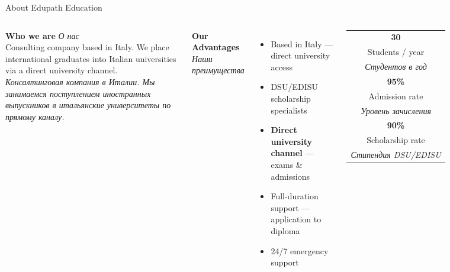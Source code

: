 \documentclass[aspectratio=169]{beamer}
\newcommand{\ru}[1]{{\textit{#1}}}
\newcommand{\biframe}[2]{\begin{frame}{#1}\noindent{\scriptsize\textit{#2}}\vspace{0.2em}}
\begin{document}
\biframe{About Edupath Education}{О компании}
\footnotesize
\begin{columns}[T]
\textbf{Who we are} \ru{О нас}\\
Consulting company based in Italy. We place international graduates into Italian universities via a direct university channel.\\
\ru{Консалтинговая компания в Италии. Мы занимаемся поступлением иностранных выпускников в итальянские университеты по прямому каналу.}

\textbf{Our Advantages} \ru{Наши преимущества}
\begin{itemize}\setlength{\itemsep}{0pt}
  \item Based in Italy — direct university access
  \item DSU/EDISU scholarship specialists
  \item \textbf{Direct university channel} — exams \& admissions
  \item Full-duration support — application to diploma
  \item 24/7 emergency support
\end{itemize}

\vspace{0.1em}
\centering
\begin{tabular}{c}
\textbf{\normalsize 30}\\
\footnotesize Students / year\\
\ru{Студентов в год}\\[0.4em]
\textbf{\normalsize 95\%}\\
\footnotesize Admission rate\\
\ru{Уровень зачисления}\\[0.4em]
\textbf{\normalsize 90\%}\\
\footnotesize Scholarship rate\\
\ru{Стипендия DSU/EDISU}
\end{tabular}
\end{columns}
\end{frame}
\end{document}
